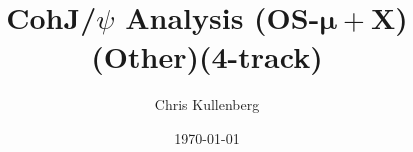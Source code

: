 \title{CohJ/$\psi$ Analysis (\textbf{OS}-$\boldsymbol{\mu+}$\textbf{X})(\textbf{Other})(\textbf{4-track})}
\author{Chris Kullenberg}
\date{\today}
